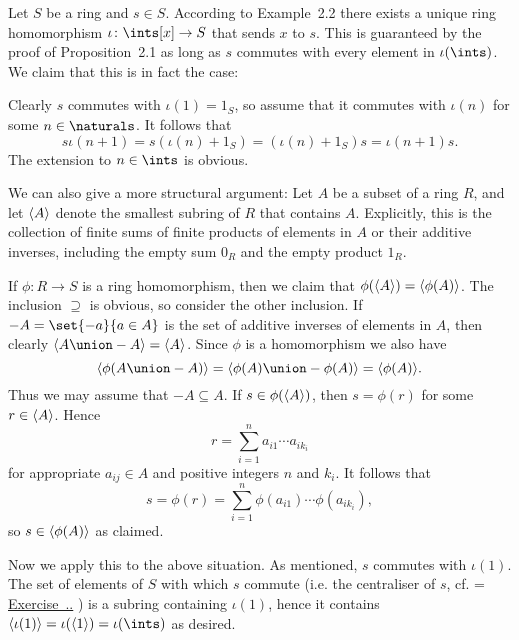 \documentclass[article, a4paper, 11pt, oneside]{memoir}
\numberwithin{equation}{chapter}
\DeclarePairedDelimiter{\gen}{\langle}{\rangle} %
\newcommand{\RNum}[1]{\uppercase\expandafter{\romannumeral #1\relax}}
\newcommand{\exref}[1]{%
    \setsepchar{.}%
    \readlist*\mylist{#1}%
    \ifnum \arabic{chapter}=\mylist[1]
        \def\mylabel{\mylist[2].\mylist[3]}%
    \else
        \def\mylabel{\RNum{\mylist[1]}.\mylist[2].\mylist[3]}%
    \fi
    \hyperref[ex:#1]{Exercise~\mylabel}%
}
\theoremstyle{nonumberplain}
\begin{document}
\begin{remark*}
    Let $S$ be a ring and $s \in S$. According to Example~2.2 there exists a unique ring homomorphism $\iota \colon \ints[x] \to S$ that sends $x$ to $s$. This is guaranteed by the proof of Proposition~2.1 as long as $s$ commutes with every element in $\iota(\ints)$. We claim that this is in fact the case:
    
    Clearly $s$ commutes with $\iota(1) = 1_S$, so assume that it commutes with $\iota(n)$ for some $n \in \naturals$. It follows that
    \begin{equation*}
        s \iota(n+1)
            = s(\iota(n) + 1_S)
            = (\iota(n) + 1_S)s
            = \iota(n+1)s.
    \end{equation*}
    The extension to $n \in \ints$ is obvious.

    We can also give a more structural argument: Let $A$ be a subset of a ring $R$, and let $\gen{A}$ denote the smallest subring of $R$ that contains $A$. Explicitly, this is the collection of finite sums of finite products of elements in $A$ or their additive inverses, including the empty sum $0_R$ and the empty product $1_R$.

    If $\phi \colon R \to S$ is a ring homomorphism, then we claim that $\phi(\gen{A}) = \gen{\phi(A)}$. The inclusion $\supseteq$ is obvious, so consider the other inclusion. If $-A = \set{-a}{a \in A}$ is the set of additive inverses of elements in $A$, then clearly $\gen{A \union -A} = \gen{A}$. Since $\phi$ is a homomorphism we also have
    \begin{equation*}
        \gen{\phi(A \union -A)}
            = \gen{\phi(A) \union -\phi(A)}
            = \gen{\phi(A)}.
    \end{equation*}
    Thus we may assume that $-A \subseteq A$. If $s \in \phi(\gen{A})$, then $s = \phi(r)$ for some $r \in \gen{A}$. Hence
    \begin{equation*}
        r
            = \sum_{i=1}^n a_{i1} \cdots a_{ik_i}
    \end{equation*}
    for appropriate $a_{ij} \in A $ and positive integers $n$ and $k_i$. It follows that
    \begin{equation*}
        s = \phi(r)
            = \sum_{i=1}^n \phi(a_{i1}) \cdots \phi(a_{ik_i}),
    \end{equation*}
    so $s \in \gen{\phi(A)}$ as claimed.

    Now we apply this to the above situation. As mentioned, $s$ commutes with $\iota(1)$. The set of elements of $S$ with which $s$ commute (i.e. the centraliser of $s$, cf. \exref{3.2.10}) is a subring containing $\iota(1)$, hence it contains $\gen{\iota(1)} = \iota(\gen{1}) = \iota(\ints)$ as desired.
\end{remark*}
\end{document}

